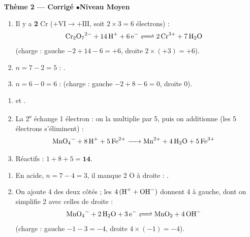\documentclass[11pt,a4paper]{article}
\begin{document}
\begin{center}\color{primarydark}\large\bfseries Thème 2 — Corrigé \quad$\bullet$\quad Niveau Moyen\end{center}

\begin{corrige}
\begin{enumerate}[label=\alph*)]
  \item Il y a \textbf{2} Cr ($+\mathrm{VI}\to+\mathrm{III}$, soit $2\times 3=6$ électrons) :
        \[\ce{Cr2O7^{2-} + 14 H+ + 6 e^- <=> 2 Cr^{3+} + 7 H2O}\]
        (charge : gauche $-2+14-6=+6$, droite $2\times(+3)=+6$).
  \item $n=7-2=5$ : .
  \item $n=6-0=6$ : 
        (charge : gauche $-2+8-6=0$, droite $0$).
\end{enumerate}
\end{corrige}

\begin{corrige}
\begin{enumerate}[label=\alph*)]
  \item {} \quad et \quad
        .
  \item La 2\textsuperscript{e} échange 1 électron : on la multiplie par 5, puis on additionne (les
        5 électrons s'éliminent) :
        \[\ce{MnO4^- + 8 H+ + 5 Fe^{2+} -> Mn^{2+} + 4 H2O + 5 Fe^{3+}}\]
  \item Réactifs : $1+8+5=\mathbf{14}$.
\end{enumerate}
\end{corrige}

\begin{corrige}
\begin{enumerate}[label=\alph*)]
  \item En acide, $n=7-4=3$, il manque 2 O à droite :
        .
  \item On ajoute 4  des deux côtés ; les $4\,(\ce{H+}+\ce{OH^-})$ donnent 4  à
        gauche, dont on simplifie 2 avec celles de droite :
        \[\ce{MnO4^- + 2 H2O + 3 e^- <=> MnO2 + 4 OH^-}\]
        (charge : gauche $-1-3=-4$, droite $4\times(-1)=-4$). \checkmark
\end{enumerate}
\end{corrige}
\end{document}
